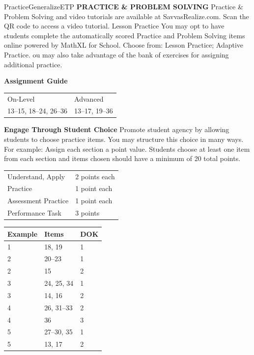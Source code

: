 \documentclass{article}
\newenvironment{item-analysis}{}{}      %
\newenvironment{te-addendum}[2]{}{}     %
\newcommand{\te}[1]{}                   %
\begin{document}
\begin{te-addendum}{Practice}{GeneralizeETP}
\textbf{PRACTICE & PROBLEM SOLVING}
Practice & Problem Solving and video tutorials are available at SavvasRealize.com.
Scan the QR code to access a video tutorial.
Lesson Practice You may opt to have students complete the automatically scored Practice and Problem Solving items online powered by MathXL for School.
Choose from: Lesson Practice; Adaptive Practice.
ou may also take advantage of the bank of exercises for assigning additional practice.
\te{Printed ``ou may''; likely ``You may.''}
\textbf{Assignment Guide}
\begin{tabular}{ll}
On-Level & Advanced \\
13--15, 18--24, 26--36 & 13--17, 19--36 \\
\end{tabular}
\textbf{Engage Through Student Choice}
Promote student agency by allowing students to choose practice items. You may structure this choice in many ways.
For example:
Assign each section a point value. Students choose at least one item from each section and items chosen should have a minimum of 20 total points.
\begin{tabular}{ll}
Understand, Apply & 2 points each \\
Practice & 1 point each \\
Assessment Practice & 1 point each \\
Performance Task & 3 points \\
\end{tabular}
\end{te-addendum}
\begin{item-analysis}
\begin{tabular}{lll}
\toprule
Example & Items & DOK \\
\midrule
1 & 18, 19 & 1 \\
2 & 20--23 & 1 \\
2 & 15 & 2 \\
3 & 24, 25, 34 & 1 \\
3 & 14, 16 & 2 \\
4 & 26, 31--33 & 2 \\
4 & 36 & 3 \\
5 & 27--30, 35 & 1 \\
5 & 13, 17 & 2 \\
\bottomrule
\end{tabular}
\end{item-analysis}
\end{document}
